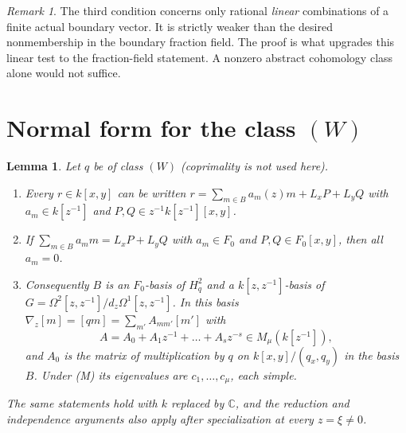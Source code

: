 \documentclass[11pt]{article}
\numberwithin{equation}{section}
\newtheorem{lemma}[lemma]{Lemma}
\theoremstyle{definition}
\theoremstyle{remark}
\newtheorem{remark}[remark]{Remark}
\newcommand{\C}{\mathbb C}
\newcommand{\Hq}{H_q^2}
\begin{document}
\begin{remark}
The third condition concerns only rational \emph{linear} combinations of a
finite actual boundary vector. It is strictly weaker than the desired
nonmembership in the boundary fraction field. The proof is what upgrades
this linear test to the fraction-field statement. A nonzero abstract
cohomology class alone would not suffice.
\end{remark}

\section{Normal form for the class \texorpdfstring{$(W)$}{(W)}}

\begin{lemma}\label{lem:normal}
Let $q$ be of class $(W)$ (coprimality is not used here).
\begin{enumerate}[label=\textup{(\alph*)},leftmargin=2.2em]
\item Every $r\in k[x,y]$ can be written
 $r=\sum_{m\in B}a_m(z)m+L_xP+L_yQ$ with $a_m\in k[z^{-1}]$ and
 $P,Q\in z^{-1}k[z^{-1}][x,y]$.
\item If $\sum_{m\in B}a_m m=L_xP+L_yQ$ with $a_m\in F_0$ and
 $P,Q\in F_0[x,y]$, then all $a_m=0$.
\item Consequently $B$ is an $F_0$-basis of $\Hq$ and a $k[z,z^{-1}]$-basis of
 $G=\Omega^2[z,z^{-1}]/d_z\Omega^1[z,z^{-1}]$. In this basis
 $\nabla_z[m]=[qm]=\sum_{m'}A_{mm'}[m']$ with
 \[
  A=A_0+A_1z^{-1}+\dots+A_sz^{-s}\in M_\mu(k[z^{-1}]),
 \]
 and $A_0$ is the matrix of multiplication by $q$ on
 $k[x,y]/(q_x,q_y)$ in the basis $B$. Under \textup{(M)} its eigenvalues are
 $c_1,\dots,c_\mu$, each simple.
\end{enumerate}
The same statements hold with $k$ replaced by $\C$, and the reduction and independence arguments also apply after specialization at every $z=\xi\ne0$.
\end{lemma}
\end{document}
